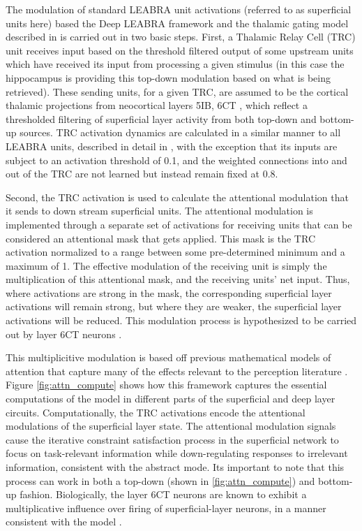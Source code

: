 \documentclass[11pt, titlepage, twoside]{article}
\begin{document}
The modulation of standard LEABRA unit activations (referred to as superficial units here) based the Deep LEABRA framework and the thalamic gating model described in \textcite{KetzJensenOReilly15} is carried out in two basic steps.  First, a Thalamic Relay Cell (TRC) unit receives input based on the threshold filtered output of some upstream units which have received its input from processing a given stimulus (in this case the hippocampus is providing this top-down modulation based on what is being retrieved).  These sending units, for a given TRC, are assumed to be the cortical thalamic projections from neocortical layers 5IB, 6CT \cite{ShermanGuillery06}, which reflect a thresholded filtering of superficial layer activity from both top-down and bottom-up sources. TRC activation dynamics are calculated in a similar manner to all LEABRA units, described in detail in \cite{KetzMorkondaOReilly13}, with the exception that its inputs are subject to an activation threshold of 0.1, and the weighted connections into and out of the TRC are not learned but instead remain fixed at 0.8.  

Second, the TRC activation is used to calculate the attentional modulation that it sends to down stream superficial units.  The attentional modulation is implemented through a separate set of activations for receiving units that can be considered an attentional mask that gets applied.  This mask is the TRC activation normalized to a range between some pre-determined minimum and a maximum of 1.  The effective modulation of the receiving unit is simply the multiplication of this attentional mask, and the receiving units' net input.  Thus, where activations are strong in the mask, the corresponding superficial layer activations will remain strong, but where they are weaker, the superficial layer activations will be reduced.  This modulation process is hypothesized to be carried out by layer 6CT neurons  \cite{BortoneOlsenScanziani14,OlsenBortoneAdesnikEtAl12}.

This multiplicitive modulation is based off previous mathematical models of attention that capture many of the effects relevant to the perception literature \cite{ReynoldsHeeger09,MontijnKlinkVanWezel12}.  Figure \ref{fig:attn_compute} shows how this framework captures the essential computations of the \textcite{ReynoldsHeeger09} model in different parts of the superficial and deep layer circuits.  Computationally, the TRC activations encode the attentional modulations of the superficial layer state. The attentional modulation signals cause the iterative constraint satisfaction process in the superficial network to focus on task-relevant information while down-regulating responses to irrelevant information, consistent with the abstract \textcite{ReynoldsHeeger09} mode.  Its important to note that this process can work in both a top-down (shown in \ref{fig:attn_compute}) and bottom-up fashion. Biologically, the layer 6CT neurons are known to exhibit a multiplicative influence over firing of superficial-layer neurons, in a manner consistent with the \textcite{ReynoldsHeeger09} model \cite{BortoneOlsenScanziani14,OlsenBortoneAdesnikEtAl12}. 
\end{document}

